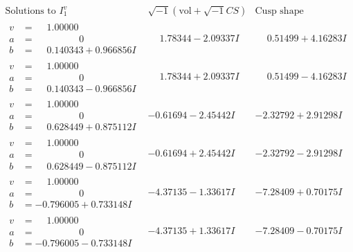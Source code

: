 \documentclass[1p]{elsarticle_modified}
\theoremstyle{definition}
\newcommand{\I}{\sqrt{-1}}
\begin{document}
$$\begin{array}{c|c|c}  
\text{Solutions to }I^v_{1}& \I (\text{vol} + \sqrt{-1}CS) & \text{Cusp shape}\\
 \hline 
\begin{aligned}
v &= \phantom{-}1.00000\phantom{ +0.000000I} \\
a &= \phantom{-0.000000 } 0 \\
b &= \phantom{-}0.140343 + 0.966856 I\end{aligned}
 & \phantom{-}1.78344 - 2.09337 I & \phantom{-}0.51499 + 4.16283 I \\ \hline\begin{aligned}
v &= \phantom{-}1.00000\phantom{ +0.000000I} \\
a &= \phantom{-0.000000 } 0 \\
b &= \phantom{-}0.140343 - 0.966856 I\end{aligned}
 & \phantom{-}1.78344 + 2.09337 I & \phantom{-}0.51499 - 4.16283 I \\ \hline\begin{aligned}
v &= \phantom{-}1.00000\phantom{ +0.000000I} \\
a &= \phantom{-0.000000 } 0 \\
b &= \phantom{-}0.628449 + 0.875112 I\end{aligned}
 & -0.61694 - 2.45442 I & -2.32792 + 2.91298 I \\ \hline\begin{aligned}
v &= \phantom{-}1.00000\phantom{ +0.000000I} \\
a &= \phantom{-0.000000 } 0 \\
b &= \phantom{-}0.628449 - 0.875112 I\end{aligned}
 & -0.61694 + 2.45442 I & -2.32792 - 2.91298 I \\ \hline\begin{aligned}
v &= \phantom{-}1.00000\phantom{ +0.000000I} \\
a &= \phantom{-0.000000 } 0 \\
b &= -0.796005 + 0.733148 I\end{aligned}
 & -4.37135 - 1.33617 I & -7.28409 + 0.70175 I \\ \hline\begin{aligned}
v &= \phantom{-}1.00000\phantom{ +0.000000I} \\
a &= \phantom{-0.000000 } 0 \\
b &= -0.796005 - 0.733148 I\end{aligned}
 & -4.37135 + 1.33617 I & -7.28409 - 0.70175 I \\ \hline\begin{aligned}

\end{aligned}
\end{array}$$
\end{document}
